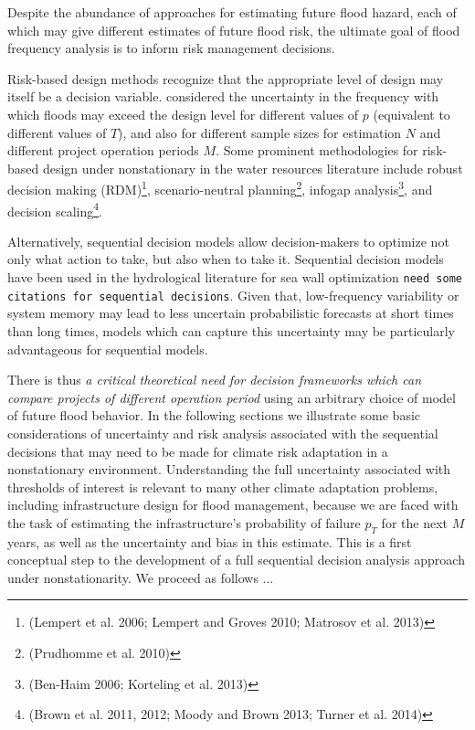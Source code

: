 \documentclass[12pt]{article}
\begin{document}
Despite the abundance of approaches for estimating future flood hazard, each of which may give different estimates of future flood risk, the ultimate goal of flood frequency analysis is to inform risk management decisions.

Risk-based design methods \citep[RBDM; see][]{Rosner2014} recognize that the appropriate level of design may itself be a decision variable.
\citet{Lall1987} considered the uncertainty in the frequency with which floods may exceed the design level for different values of \(p\) (equivalent to different values of \(T\)), and also for different sample sizes for estimation \(N\) and different project operation periods \(M\).
Some prominent methodologies for risk-based design under nonstationary in the water resources literature include robust decision making (RDM)\footnote{(Lempert et al. 2006; Lempert and Groves 2010; Matrosov et al. 2013)}, scenario-neutral planning\footnote{(Prudhomme et al. 2010)}, infogap analysis\footnote{(Ben-Haim 2006; Korteling et al. 2013)}, and decision scaling\footnote{(Brown et al. 2011, 2012; Moody and Brown 2013; Turner et al. 2014)}.

Alternatively, sequential decision models \citep[see][]{Russell2003,Howard1960} allow decision-makers to optimize not only what action to take, but also when to take it.
Sequential decision models have been used in the hydrological literature for sea wall optimization \citep{Lickley2014}
\texttt{need some citations for sequential decisions}.
Given that, low-frequency variability or system memory may lead to less uncertain probabilistic forecasts at short times than long times, models which can capture this uncertainty may be particularly advantageous for sequential models.

There is thus \emph{a critical theoretical need for decision frameworks which can compare projects of different operation period} using an arbitrary choice of model of future flood behavior.
In the following sections we illustrate some basic considerations of uncertainty and risk analysis associated with the sequential decisions that may need to be made for climate risk adaptation in a nonstationary environment.
Understanding the full uncertainty associated with thresholds of interest is relevant to many other climate adaptation problems, including infrastructure design for flood management, because we are faced with the task of estimating the infrastructure's probability of failure \(p_T\) for the next \(M\) years, as well as the uncertainty and bias in this estimate.
This is a first conceptual step to the development of a full sequential decision analysis approach under nonstationarity.
We proceed as follows \(\ldots{}\)
\end{document}
